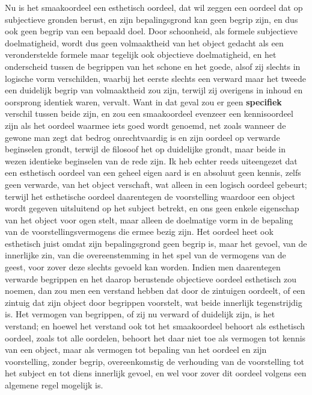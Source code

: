 Nu is het smaakoordeel een esthetisch oordeel, dat wil zeggen een oordeel dat op subjectieve gronden berust, en zijn bepalingsgrond kan geen begrip zijn, en dus ook geen begrip van een bepaald doel. Door schoonheid, als formele subjectieve doelmatigheid, wordt dus geen volmaaktheid van het object gedacht als een veronderstelde formele maar tegelijk ook objectieve doelmatigheid, en het onderscheid tussen de begrippen van het schone en het goede, alsof zij slechts in logische vorm verschilden, waarbij het eerste slechts een verward maar het tweede een duidelijk begrip van volmaaktheid zou zijn, terwijl zij overigens in inhoud en oorsprong identiek waren, vervalt. Want in dat geval zou er geen \textbf{specifiek} verschil tussen beide zijn, en zou een smaakoordeel evenzeer een kennisoordeel zijn als het oordeel waarmee iets goed wordt genoemd, net zoals wanneer de gewone man zegt dat bedrog onrechtvaardig is en zijn oordeel op verwarde beginselen grondt, terwijl de filosoof het op duidelijke grondt, maar beide in wezen identieke beginselen van de rede zijn. Ik heb echter reeds uiteengezet dat een esthetisch oordeel van een geheel eigen aard is en absoluut geen kennis, zelfs geen verwarde, van het object verschaft, wat alleen in een logisch oordeel gebeurt; terwijl het esthetische oordeel daarentegen de voorstelling waardoor een object wordt gegeven uitsluitend op het subject betrekt, en ons geen enkele eigenschap van het object voor ogen stelt, maar alleen de doelmatige vorm in de bepaling van de voorstellingsvermogens die ermee bezig zijn. Het oordeel heet ook esthetisch juist omdat zijn bepalingsgrond geen begrip is, maar het gevoel, van de innerlijke zin, van die overeenstemming in het spel van de vermogens van de geest, voor zover deze slechts gevoeld kan worden. Indien men daarentegen verwarde begrippen en het daarop berustende objectieve oordeel esthetisch zou noemen, dan zou men een verstand hebben dat door de zintuigen oordeelt, of een zintuig dat zijn object door begrippen voorstelt, wat beide innerlijk tegenstrijdig is. Het vermogen van begrippen, of zij nu verward of duidelijk zijn, is het verstand; en hoewel het verstand ook tot het smaakoordeel behoort als esthetisch oordeel, zoals tot alle oordelen, behoort het daar niet toe als vermogen tot kennis van een object, maar als vermogen tot bepaling van het oordeel en zijn voorstelling, zonder begrip, overeenkomstig de verhouding van de voorstelling tot het subject en tot diens innerlijk gevoel, en wel voor zover dit oordeel volgens een algemene regel mogelijk is.

